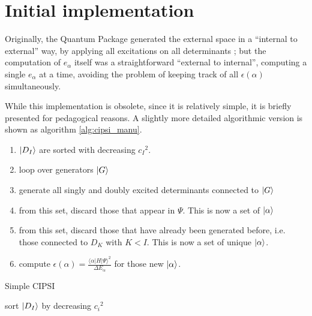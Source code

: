 \documentclass[./thesis.tex]{subfiles}
\begin{document}
\section{Initial implementation}

Originally, the Quantum Package generated the external space in a ``internal to external'' way, by applying all excitations on all determinants ; but the computation of $e_\alpha$ itself was a straightforward ``external to internal'', computing a single $e_\alpha$ at a time, avoiding the problem of keeping track of all $\epsilon(\alpha)$ simultaneously.

While this implementation is obsolete, since it is relatively simple, it is briefly presented for pedagogical reasons. A slightly more detailed algorithmic version is shown as algorithm \ref{alg:cipsi_manu}.

\begin{enumerate}
\item
$\ket {D_I}$ are sorted with decreasing ${c_I}^2$.
\item
loop over generators $\ket G$
\item
generate all singly and doubly excited determinants connected to $\ket G$
\item
from this set, discard those that appear in $\Psi$. This is now a set of $\ket \alpha$
\item
from this set, discard those that have already been generated before, i.e. those connected to $D_K$ with $K<I$. This is now a set of unique $\ket \alpha$.
\item
compute $\epsilon(\alpha) = \frac{\langle \alpha|H|\Psi\rangle^2}{\Delta E_\alpha}$ for those new $\ket \alpha$.
\end{enumerate}


\begin{algorithm}
	\label{alg:cipsi_manu}
	\caption{Simple CIPSI}
		\KwData{ $\ket \Psi$ }
		sort $\ket {D_I}$ by decreasing ${c_i}^2$ \;
\end{algorithm}
\end{document}
